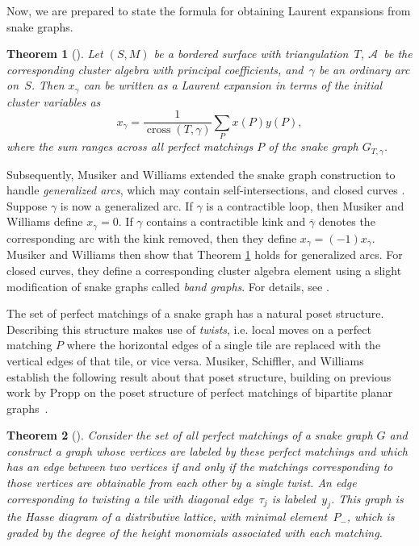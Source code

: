 \documentclass[pdftex]{sigma}%
\numberwithin{equation}{section}
\newtheorem{Theorem}{Theorem}[section]
\begin{document}
Now, we are prepared to state the formula for obtaining Laurent expansions from snake graphs.

\begin{Theorem}[{\cite[Theorem 4.9]{MSW}}]\label{theorem:clusterExpansion_ordinary}
Let $(S,M)$ be a bordered surface with triangulation~$T$, $\mathcal{A}$~be the corresponding cluster algebra with principal coefficients, and~$\gamma$ be an ordinary arc on~$S$. Then $x_\gamma$ can be written as a Laurent expansion in terms of the initial cluster variables as
\[ x_\gamma = \frac{1}{\operatorname{cross}(T,\gamma)}\sum_P x(P)y(P), \]
where the sum ranges across all perfect matchings $P$ of the snake graph $G_{T,\gamma}$.
\end{Theorem}

Subsequently, Musiker and Williams extended the snake graph construction to handle \emph{generalized arcs}, which may contain self-intersections, and closed curves \cite{MW}. Suppose $\gamma$ is now a generalized arc. If $\gamma$ is a contractible loop, then Musiker and Williams define $x_\gamma = 0$. If $\gamma$ contains a contractible kink and $\overline{\gamma}$ denotes the corresponding arc with the kink removed, then they define $x_\gamma = (-1)x_{\overline{\gamma}}$. Musiker and Williams then show that Theorem \ref{theorem:clusterExpansion_ordinary} holds for generalized arcs. For closed curves, they define a corresponding cluster algebra element using a slight modification of snake graphs called \emph{band graphs}. For details, see \cite[Section~3]{MW}.

The set of perfect matchings of a snake graph has a natural poset structure. Describing this structure makes use of \emph{twists}, i.e. local moves on a perfect matching $P$ where the horizontal edges of a single tile are replaced with the vertical edges of that tile, or vice versa. Musiker, Schiffler, and Williams~\cite{MSW-bases} establish the following result about that poset structure, building on previous work by Propp on the poset structure of perfect matchings of bipartite planar graphs~\cite{Propp}.

\begin{Theorem}[{\cite[Theorem 5.2]{MSW-bases}}]\label{Thm:PMPoset}
Consider the set of all perfect matchings of a snake graph $G$ and construct a graph whose vertices are labeled by these perfect matchings and which has an edge between two vertices if and only if the matchings corresponding to those vertices are obtainable from each other by a single twist. An edge corresponding to twisting a tile with diagonal edge~$\tau_j$ is labeled~$y_j$. This graph is the Hasse diagram of a distributive lattice, with minimal element~$P_{-}$, which is graded by the degree of the height monomials associated with each matching.
\end{Theorem}
\end{document}
